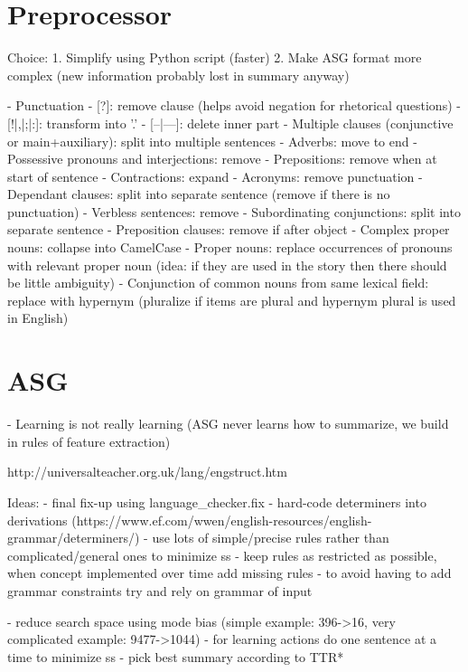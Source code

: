 \documentclass[12pt,twoside]{report}
\theoremstyle{definition}
\begin{document}
\chapter{Preprocessor}


Choice:
1. Simplify using Python script (faster)
2. Make ASG format more complex (new information probably lost in summary anyway)

- Punctuation
    - [?]: remove clause (helps avoid negation for rhetorical questions)
    - [!|,|;|:]: transform into '.'
    - [–|—]: delete inner part
- Multiple clauses (conjunctive or main+auxiliary): split into multiple sentences
- Adverbs: move to end
- Possessive pronouns and interjections: remove
- Prepositions: remove when at start of sentence
- Contractions: expand
- Acronyms: remove punctuation
- Dependant clauses: split into separate sentence (remove if there is no punctuation)
- Verbless sentences: remove
- Subordinating conjunctions: split into separate sentence
- Preposition clauses: remove if after object
- Complex proper nouns: collapse into CamelCase
- Proper nouns: replace occurrences of pronouns with relevant proper noun (idea: if they are used in the story then there should be little ambiguity)
- Conjunction of common nouns from same lexical field: replace with hypernym (pluralize if items are plural and hypernym plural is used in English)

\chapter{ASG}


- Learning is not really learning (ASG never learns how to summarize, we build in rules of feature extraction)

http://universalteacher.org.uk/lang/engstruct.htm

Ideas:
- final fix-up using language\_checker.fix
- hard-code determiners into derivations (https://www.ef.com/wwen/english-resources/english-grammar/determiners/)
- use lots of simple/precise rules rather than complicated/general ones to minimize ss
- keep rules as restricted as possible, when concept implemented over time add missing rules
- to avoid having to add grammar constraints try and rely on grammar of input

- reduce search space using mode bias (simple example: 396->16, very complicated example: 9477->1044)
- for learning actions do one sentence at a time to minimize ss
- pick best summary according to TTR*
\end{document}
